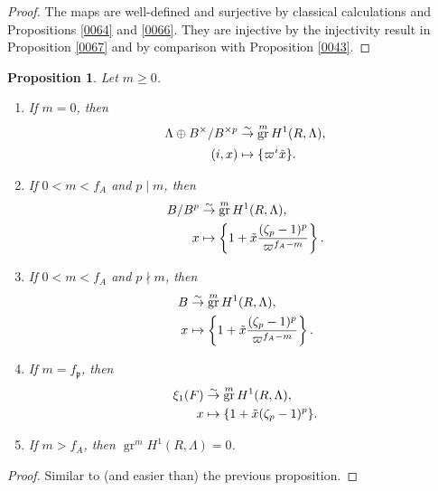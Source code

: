 \documentclass{amsart}
\newtheorem{Prop}[Thm]{Proposition}
\theoremstyle{remark}
\numberwithin{equation}{subsection}
\newcommand{\isomto}{\overset{\sim}{\to}}
\newcommand{\ideal}[1]{\mathfrak{#1}}
\DeclareMathOperator{\gr}{gr}
\begin{document}
\begin{proof}
	The maps are well-defined and surjective by classical calculations
	and Propositions \ref{0064}
	and \ref{0066}.
	They are injective by the injectivity result in
	Proposition \ref{0067}
	and by comparison with
	Proposition \ref{0043}.
\end{proof}

\begin{Prop} \label{0070}
	Let $m \ge 0$.
	\begin{enumerate}
		\item \label{0212}
			If $m = 0$, then
				\begin{align*}
							\Lambda \oplus B^{\times} / B^{\times p}
					&	\isomto
							\gr^{m} H^{1}(R, \Lambda),
					\\
							(i, x)
					&	\mapsto
							\{\varpi^{i} \Tilde{x}\}.
				\end{align*}
		\item \label{0213}
			If $0 < m < f_{A}$ and $p \mid m$, then
				\begin{align*}
							B / B^{p}
					&	\isomto
							\gr^{m} H^{1}(R, \Lambda),
					\\
							x
					&	\mapsto
							\left\{
									1
								+
									\Tilde{x}
									\frac{
										(\zeta_{p} - 1)^{p}
									}{
										\varpi^{f_{A} - m}
									}
							\right\}.
				\end{align*}
		\item \label{0214}
			If $0 < m < f_{A}$ and $p \nmid m$, then
				\begin{align*}
							B
					&	\isomto
							\gr^{m} H^{1}(R, \Lambda),
					\\
							x
					&	\mapsto
							\left\{
								1 + \Tilde{x} \frac{(\zeta_{p} - 1)^{p}}{\varpi^{f_{A} - m}}
							\right\}.
				\end{align*}
		\item \label{0215}
			If $m = f_{\ideal{p}}$, then
				\begin{align*}
							\xi_{1}(F)
					&	\isomto
							\gr^{m} H^{1}(R, \Lambda),
					\\
							x
					&	\mapsto
							\{1 + \Tilde{x} (\zeta_{p} - 1)^{p}\}.
				\end{align*}
		\item \label{0216}
			If $m > f_{A}$, then $\gr^{m} H^{1}(R, \Lambda) = 0$.
	\end{enumerate}
\end{Prop}

\begin{proof}
	Similar to (and easier than) the previous proposition.
\end{proof}
\end{document}
